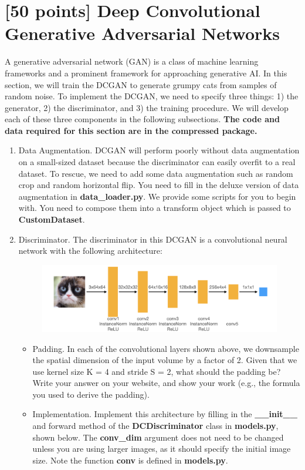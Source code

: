 \documentclass[]{article}
\begin{document}
\section{[50 points] Deep Convolutional Generative Adversarial Networks}
A generative adversarial network (GAN) is a class of machine learning frameworks and a prominent framework for approaching generative AI. In this section, we will train the DCGAN to generate grumpy cats from samples of random noise. To implement the DCGAN, we need to specify three things: 1) the generator, 2) the discriminator, and 3) the training procedure. We will develop each of these three components in the following subsections. \textbf{The code and data required for this section are in the compressed package.} 
\begin{enumerate}
    \item Data Augmentation. DCGAN will perform poorly without data augmentation on a small-sized dataset because the discriminator can easily overfit to a real dataset. To rescue, we need to add some data augmentation such as random crop and random horizontal flip. You need to fill in the deluxe version of data augmentation in \textbf{data\_loader.py}. We provide some scripts for you to begin with. You need to compose them into a transform object which is passed to \textbf{CustomDataset}.
    \item Discriminator. The discriminator in this DCGAN is a convolutional neural network with the following architecture:
    \begin{figure}[h]
        \centering
        \includegraphics[width=0.9\linewidth]{disc.png}
        \label{fig:enter-label}
    \end{figure}
        \begin{itemize}
            \item Padding. In each of the convolutional layers shown above, we downsample the spatial dimension of the input volume by a factor of 2. Given that we use kernel size K = 4 and stride S = 2, what should the padding be? Write your answer on your website, and show your work (e.g., the formula you used to derive the padding).
            \item Implementation. Implement this architecture by filling in the \textbf{\_\_init\_\_} and forward method of the\textbf{ DCDiscriminator} class in \textbf{models.py}, shown below. The\textbf{ conv\_dim} argument does not need to be changed unless you are using larger images, as it should specify the initial image size. Note the function \textbf{conv} is defined in \textbf{models.py}.

\end{itemize}
\end{enumerate}
\end{document}

